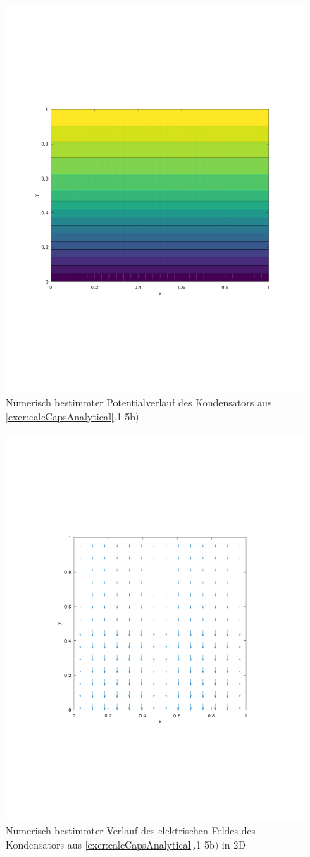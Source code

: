 \documentclass[Protokollheft.tex]{subfiles}
\begin{document}
\begin{figure}[h!]
	\centering
	\includegraphics[trim = 20mm 70mm 20mm 70mm, clip,width=0.7\linewidth]{potential_B.pdf}
	\caption{Numerisch bestimmter Potentialverlauf des Kondensators aus \ref{exer:calcCapsAnalytical}.1 5b$)$}
\end{figure}

\begin{figure}[h!]
	\centering
	\includegraphics[trim = 20mm 70mm 20mm 70mm, clip,width=0.7\linewidth]{E_2D_B.pdf}
	\caption{Numerisch bestimmter Verlauf des elektrischen Feldes des Kondensators aus \ref{exer:calcCapsAnalytical}.1 5b$)$ in 2D}
\end{figure}
\end{document}
